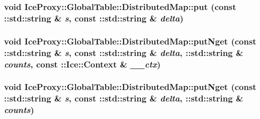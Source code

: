 \label{class_ice_proxy_1_1_global_table_1_1_distributed_map_a7510d666de09272847660a1709cf8b73}
\hypertarget{class_ice_proxy_1_1_global_table_1_1_distributed_map_aff768ea2e4278baf489e053a7c91d860}{
\subsubsection[{put}]{\setlength{\rightskip}{0pt plus 5cm}void IceProxy::GlobalTable::DistributedMap::put (const ::std::string \& {\em s}, \/  const ::std::string \& {\em delta})}}
\label{class_ice_proxy_1_1_global_table_1_1_distributed_map_aff768ea2e4278baf489e053a7c91d860}
\hypertarget{class_ice_proxy_1_1_global_table_1_1_distributed_map_a28fa9fb67cd94138e315b679da85a247}{
\subsubsection[{putNget}]{\setlength{\rightskip}{0pt plus 5cm}void IceProxy::GlobalTable::DistributedMap::putNget (const ::std::string \& {\em s}, \/  const ::std::string \& {\em delta}, \/  ::std::string \& {\em counts}, \/  const ::Ice::Context \& {\em \_\-\_\-ctx})}}
\label{class_ice_proxy_1_1_global_table_1_1_distributed_map_a28fa9fb67cd94138e315b679da85a247}
\hypertarget{class_ice_proxy_1_1_global_table_1_1_distributed_map_a2f7fd37f656e343b2562b0976203a040}{
\subsubsection[{putNget}]{\setlength{\rightskip}{0pt plus 5cm}void IceProxy::GlobalTable::DistributedMap::putNget (const ::std::string \& {\em s}, \/  const ::std::string \& {\em delta}, \/  ::std::string \& {\em counts})}}
